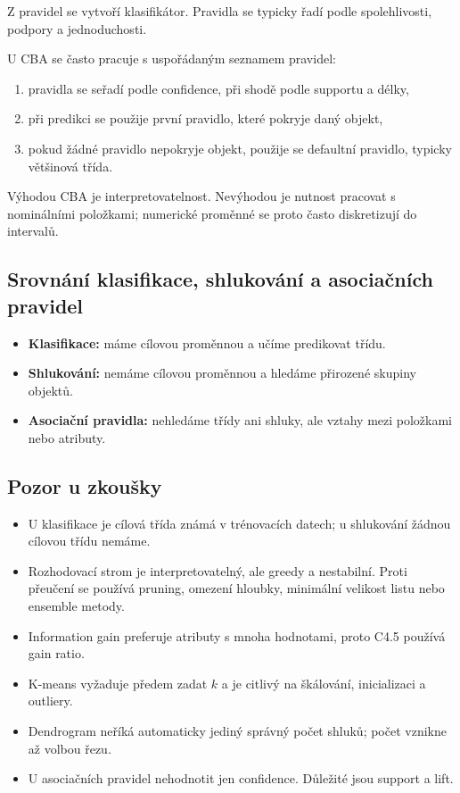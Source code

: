 Z pravidel se vytvoří klasifikátor. Pravidla se typicky řadí podle spolehlivosti, podpory a jednoduchosti.

U CBA se často pracuje s uspořádaným seznamem pravidel:
\begin{enumerate}
    \item pravidla se seřadí podle confidence, při shodě podle supportu a délky,
    \item při predikci se použije první pravidlo, které pokryje daný objekt,
    \item pokud žádné pravidlo nepokryje objekt, použije se defaultní pravidlo, typicky většinová třída.
\end{enumerate}

Výhodou CBA je interpretovatelnost. Nevýhodou je nutnost pracovat s nominálními položkami; numerické
proměnné se proto často diskretizují do intervalů.

\subsection{Srovnání klasifikace, shlukování a asociačních pravidel}

\begin{itemize}
    \item \textbf{Klasifikace:}
    máme cílovou proměnnou a učíme predikovat třídu.
    
    \item \textbf{Shlukování:}
    nemáme cílovou proměnnou a hledáme přirozené skupiny objektů.
    
    \item \textbf{Asociační pravidla:}
    nehledáme třídy ani shluky, ale vztahy mezi položkami nebo atributy.
\end{itemize}

\subsection{Pozor u zkoušky}

\begin{itemize}
    \item U klasifikace je cílová třída známá v trénovacích datech; u shlukování žádnou cílovou třídu nemáme.
    \item Rozhodovací strom je interpretovatelný, ale greedy a nestabilní. Proti přeučení se používá pruning,
    omezení hloubky, minimální velikost listu nebo ensemble metody.
    \item Information gain preferuje atributy s mnoha hodnotami, proto C4.5 používá gain ratio.
    \item K-means vyžaduje předem zadat $k$ a je citlivý na škálování, inicializaci a outliery.
    \item Dendrogram neříká automaticky jediný správný počet shluků; počet vznikne až volbou řezu.
    \item U asociačních pravidel nehodnotit jen confidence. Důležité jsou support a lift.
\end{itemize}

